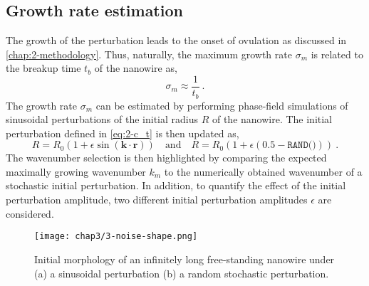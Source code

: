 \subsection{Growth rate estimation}
The growth of the perturbation leads to the onset of ovulation as discussed in \autoref{chap:2-methodology}. Thus, naturally, the maximum growth rate $\sigma_m$ is related to the breakup time $t_b$ of the nanowire as,
\begin{equation}
    \sigma_m \approx \frac{1}{t_b}\ .
\end{equation}
The growth rate $\sigma_m$ can be estimated by performing phase-field simulations of sinusoidal perturbations of the initial radius $R$ of the nanowire. The initial perturbation defined in \autoref{eq:2-c_t} is then updated as,
\begin{equation}
    R = R_0 (1 + \epsilon \sin{(\mathbf{k}\cdot\mathbf{r})}) \quad\text{and}\quad R = R_0 (1 + \epsilon (0.5 - \texttt{RAND()}))\ .
\end{equation}
The wavenumber selection is then highlighted by comparing the expected maximally growing wavenumber $k_m$ to the numerically obtained wavenumber of a stochastic initial perturbation. In addition, to quantify the effect of the initial perturbation amplitude, two different initial perturbation amplitudes $\epsilon$ are considered.
\begin{figure}[H]
    \centering
    \texttt{[image: chap3/3-noise-shape.png]}
    \caption{Initial morphology of an infinitely long free-standing nanowire under (a) a sinusoidal perturbation (b) a random stochastic perturbation.}
    \label{fig:3-initial-noise-shape}
\end{figure}